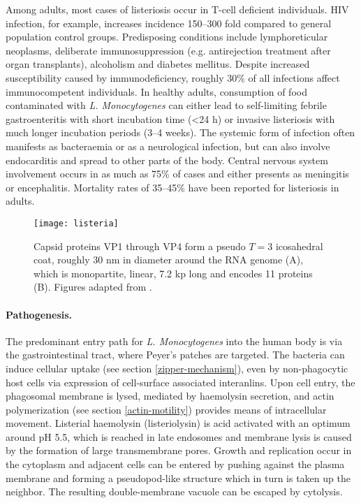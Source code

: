 Among adults, most cases of listeriosis occur in T-cell deficient individuals. HIV infection, for example, increases incidence 150--300 fold compared to general population control groups. Predisposing conditions include lymphoreticular neoplasms, deliberate immunosuppression (e.g. antirejection treatment after organ transplants), alcoholism and diabetes mellitus. Despite increased susceptibility caused by immunodeficiency, roughly 30\% of all infections affect immunocompetent individuals. In healthy adults, consumption of food contaminated with \textit{L. Monocytogenes} can either lead to self-limiting febrile gastroenteritis with short incubation time (\textless 24 h) or invasive listeriosis with much longer incubation periods (3--4 weeks). The systemic form of infection often manifests as bacteraemia or as a neurological infection, but can also involve endocarditis and spread to other parts of the body. Central nervous system involvement occurs in as much as 75\% of cases and either presents as meningitis or encephalitis. Mortality rates of 35--45\% have been reported for listeriosis in adults.

\begin{figure}
  \centering
  \texttt{[image: listeria]}
  \caption[Capsid structure and genome of rhinoviruses.]{Capsid proteins VP1 through VP4 form a pseudo $T=3$ icosahedral coat, roughly 30 nm in diameter around the RNA genome (A), which is monopartite, linear, 7.2 kp long and encodes 11 proteins (B). Figures adapted from \cite{Hybiske2008}.}
  \label{fig:listeria}
\end{figure}

\paragraph{Pathogenesis.}
The predominant entry path for \textit{L. Monocytogenes} into the human body is via the gastrointestinal tract, where Peyer's patches are targeted. The bacteria can induce cellular uptake (see section \ref{zipper-mechanism}), even by non-phagocytic host cells via expression of cell-surface associated interanlins. Upon cell entry, the phagosomal membrane is lysed, mediated by haemolysin secretion, and actin polymerization (see section \ref{actin-motility}) provides means of intracellular movement. Listerial haemolysin (listeriolysin) is acid activated with an optimum around pH 5.5, which is reached in late endosomes and membrane lysis is caused by the formation of large transmembrane pores. Growth and replication occur in the cytoplasm and adjacent cells can be entered by pushing against the plasma membrane and forming a pseudopod-like structure which in turn is taken up the neighbor. The resulting double-membrane vacuole can be escaped by cytolysis.

